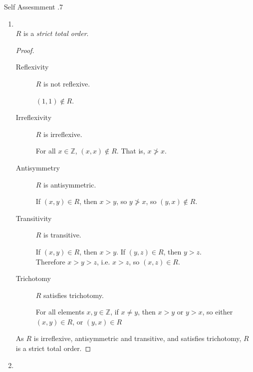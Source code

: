 \documentclass[../notes.tex]{subfiles}
\begin{document}
\begin{exercise}{Self Assesmment \thechapter.7}
\begin{enumerate}
\begin{proof}
								As $R$ is reflexive, antisymmetric and transitive, and satisfies trichotomy, $R$ is a weak total order.
							\end{proof}
						\item {}\\
							$R$ is a \emph{strict total order}.
							\begin{proof}
								$ $
								\begin{description}
									\item[Reflexivity] $R$ is not reflexive.
										\begin{subproof}[Counterexample]
											$(1, 1) \notin R$.
										\end{subproof}
									\item[Irreflexivity] $R$ is irreflexive.
										\begin{subproof}
											For all $x \in \mathbb{Z}$, $(x, x) \notin R$. That is, $x \not > x$.
										\end{subproof}
									\item[Antisymmetry] $R$ is antisymmetric.
										\begin{subproof}
											If $(x, y) \in R$, then $x > y$, so $y \not > x$, so $(y, x) \notin R$.
										\end{subproof}
									\item[Transitivity] $R$ is transitive.
										\begin{subproof}
											If $(x, y) \in R$, then $x > y$. If $(y, z) \in R$, then $y > z$.\\
											Therefore $x > y > z$, i.e. $x > z$, so $(x, z) \in R$.
										\end{subproof}
									\item[Trichotomy] $R$ satisfies trichotomy.
										\begin{subproof}
											For all elements $x, y \in \mathbb{Z}$, if $x \neq y$, then $x > y$ or $y > x$, so either $(x, y) \in R$, or $(y, x) \in R$
										\end{subproof}
								\end{description}
								As $R$ is irreflexive, antisymmetric and transitive, and satisfies trichotomy, $R$ is a strict total order.
							\end{proof}
						\pagebreak
						\item {}\\

\end{enumerate}
\end{exercise}
\end{document}

